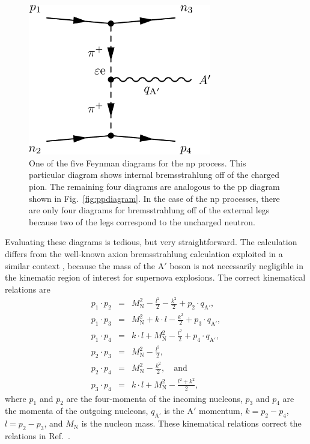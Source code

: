 \documentclass[nofootinbib,prd,superscriptaddress,twocolumn]{revtex4}
\newcommand{\bea}{\begin{eqnarray}}
\newcommand{\eea}{\end{eqnarray}}
\newcommand{\qa}{q_{\mathrm{A}'}}
\newcommand{\Aprime}{\mathrm{A}'}
\begin{document}
\begin{figure}
\includegraphics[width=8cm]{npdiagram.pdf}
\caption{One of the five Feynman diagrams for the np process. This particular diagram shows 
internal bremsstrahlung off of the charged pion. The remaining four diagrams are analogous to the 
pp diagram shown in Fig.~\ref{fig:ppdiagram}. In the case of the np processes, there are only four 
diagrams for bremsstrahlung off of the external legs because two of the legs correspond to the 
uncharged neutron.}
\label{fig:npdiagram}
\end{figure}

	
Evaluating these diagrams is tedious, but very straightforward. The calculation differs 
from the well-known axion bremsstrahlung calculation exploited in a similar context \cite{raffelt96_book}, 
because the mass of the $\Aprime$ boson is not necessarily negligible in the kinematic 
region of interest for supernova explosions. The correct kinematical relations are 
%
\bea 
p_1 \cdot p_2 &=& M_{\mathrm N}^2 - \frac{l^2}{2} - \frac{k^2}{2} + p_2 \cdot \qa,\\
p_1 \cdot p_3 &=& M_{\mathrm N}^2 + k \cdot l - \frac{k^2}{2} + p_3 \cdot \qa,\\  
p_1 \cdot p_4 &=& k \cdot l + M_{\mathrm N}^2 - \frac{l^2}{2} + p_4 \cdot \qa, \\
p_2 \cdot p_3 &=& M_{\mathrm N}^2 - \frac{l^2}{2}, \\ 
p_2 \cdot p_4 &=& M_{\mathrm N}^2 - \frac{k^2}{2},\quad \mathrm{and}\\
p_3 \cdot p_4 &=& k \cdot l + M_{\mathrm N}^2 - \frac{l^2 + k^2}{2},
\eea
%
where $p_1$ and $p_2$ are the four-momenta of the incoming nucleons, $p_3$ and $p_4$ are the momenta 
of the outgoing nucleons, $\qa$ is the $\Aprime$ momentum, $k=p_2 - p_4$, $l=p_2 - p_3$, and $M_{\mathrm{N}}$ 
is the nucleon mass. These kinematical relations correct the relations in Ref.~\cite{dent_etal12}.
\end{document}
